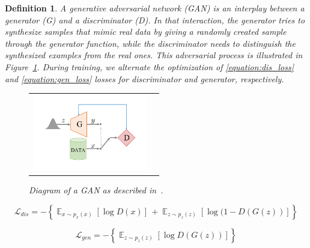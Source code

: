 \documentclass[12pt]{article}
\newtheorem{definition}{Definition}
\begin{document}
    \begin{definition}
        \normalfont
        A \emph{generative adversarial network} (GAN) \cite{NIPS2014_5ca3e9b1} is an interplay between a \emph{generator} (G) and a \emph{discriminator} (D).
        In that interaction, the generator tries to synthesize samples that mimic real data by giving a randomly created sample through the generator function, while the discriminator needs to distinguish the synthesized examples from the real ones. This adversarial process is illustrated in Figure~\ref{figure:diagram_of_gan}. During training, we alternate the optimization of   \eqref{equation:dis_loss} and \eqref{equation:gen_loss} losses for discriminator and generator, respectively.

        \begin{figure}[H]
            \centering
            \begin{tabular}{cc}
                \includegraphics[width = 50mm]{gan}
            \end{tabular}
            \caption{Diagram of a GAN as described in~\cite{pmlr-v80-achlioptas18a}.}
            \label{figure:diagram_of_gan}
        \end{figure}

        \begin{equation}
            \mathcal{L}_{dis} = -\left\{ \mathop{\mathbb{E}}_{x \sim p_x(x)}[\log D(x)]\,+ \mathop{\mathbb{E}}_{z \sim p_z(z)}[\log (1 - D(G(z))]\right\}
            \label{equation:dis_loss}
        \end{equation}

        \begin{equation}
            \mathcal{L}_{gen} = -\left\{\mathop{\mathbb{E}}_{z \sim p_z(z)}[\log D(G(z))]\right\}
            \label{equation:gen_loss}
        \end{equation}

        \label{definition:gan}
    \end{definition}
\end{document}
